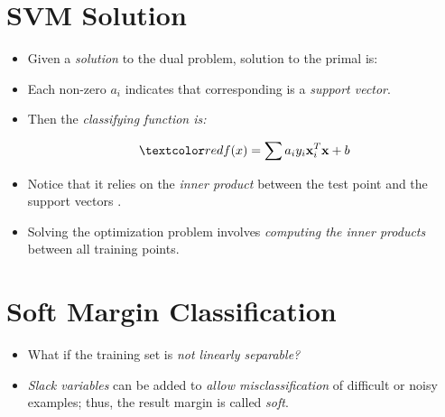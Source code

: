 \documentclass[
	title={SVM}
]{cs584notes}
\begin{document}

\tableofcontents

\section{SVM Solution}\label{sec:svm-solution}
\begin{itemize}
	\item Given a \emph{solution}  to the dual problem, solution to the primal is:
	\begin{svmbox}
		\data{\[ \vec{w} = \sum a_{i}y_{i}\vec{x}\ \ \ b = y_{k} - \sum a_{i}y_{i}\vec{x}_{i}^{T}\vec{x}_{k} \mbox{ for any } a_{k} > 0  \]}
	\end{svmbox}
	\item Each non-zero $a_{i}$ indicates that corresponding  is a \emph{support vector}.
	\item Then the \emph{classifying function is:}
	\begin{svmbox}
		\[ \data{ f(x) = \sum a_{i}y_{i}\vec{x}_{i}^{T}\vec{x} + b } \]
	\end{svmbox}
	\item Notice that it relies on the \emph{inner product} between the test point  and the support vectors .
	\item Solving the optimization problem involves \emph{computing the inner products}  between all training points.
\end{itemize}

\section{Soft Margin Classification}\label{sec:soft-margin-classification}
\begin{itemize}
	\item What if the training set is \emph{not linearly separable?}
	\item \emph{Slack variables} can be added to \emph{allow misclassification} of difficult or noisy examples; thus, the result margin is called \emph{soft}.
\end{itemize}
\end{document}
